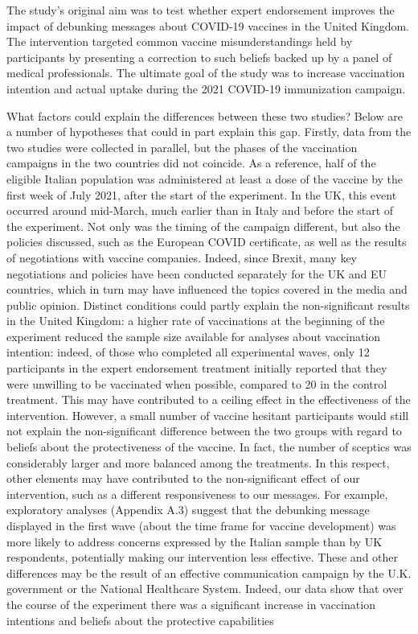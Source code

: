\documentclass[authordate, empirical]{jote-new-article}
\begin{document}
\begin{originalPurpose}



  The study's original aim was to test whether expert endorsement improves the impact of debunking messages about COVID-19 vaccines in the United Kingdom. The intervention targeted common vaccine misunderstandings held by participants by presenting a correction to such beliefs backed up by a panel of medical professionals. The ultimate goal of the study was to increase vaccination intention and actual uptake during the 2021 COVID-19 immunization campaign.

\end{originalPurpose}

What factors could explain the differences between these two studies? Below are a number of hypotheses that could in part explain this gap. Firstly, data from the two studies were collected in parallel, but the phases of the vaccination campaigns in the two countries did not coincide. As a reference, half of the eligible Italian population was administered at least a dose of the vaccine by the first week of July 2021, after the start of the experiment. In the UK, this event occurred around mid-March, much earlier than in Italy and before the start of the experiment. Not only was the timing of the campaign different, but also the policies discussed, such as the European COVID certificate, as well as the results of negotiations with vaccine companies. Indeed, since Brexit, many key negotiations and policies have been conducted separately for the UK and EU countries, which in turn may have influenced the topics covered in the media and public opinion. Distinct conditions could partly explain the non-significant results in the United Kingdom: a higher rate of vaccinations at the beginning of the experiment reduced the sample size available for analyses about vaccination intention: indeed, of those who completed all experimental waves, only 12 participants in the expert endorsement treatment initially reported that they were unwilling to be vaccinated when possible, compared to 20 in the control treatment. This may have contributed to a ceiling effect in the effectiveness of the intervention. However, a small number of vaccine hesitant participants would still not explain the non-significant difference between the two groups with regard to beliefs about the protectiveness of the vaccine. In fact, the number of sceptics was considerably larger and more balanced among the treatments. In this respect, other elements may have contributed to the non-significant effect of our intervention, such as a different responsiveness to our messages. For example, exploratory analyses (Appendix A.3) suggest that the debunking message displayed in the first wave (about the time frame for vaccine development) was more likely to address concerns expressed by the Italian sample than by UK respondents, potentially making our intervention less effective. These and other differences may be the result of an effective communication campaign by the U.K. government or the National Healthcare System. Indeed, our data show that over the course of the experiment there was a significant increase in vaccination intentions and beliefs about the protective capabilities 
\end{document}
